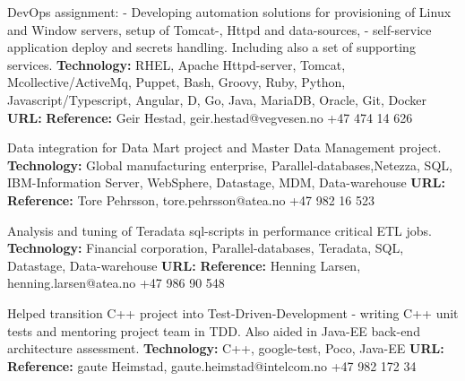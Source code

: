 \documentclass[11pt,a4paper,sans]{moderncv} %
\begin{document}
{
DevOps assignment: - Developing automation solutions for provisioning of Linux and Window servers, setup of Tomcat-, Httpd and data-sources, - self-service application deploy and secrets handling. Including also a set of supporting services.
\newline{}\textbf{Technology:}
RHEL, Apache Httpd-server, Tomcat, Mcollective/ActiveMq, Puppet, Bash, Groovy, Ruby, Python, Javascript/Typescript, Angular, D, Go, Java, MariaDB, Oracle, Git, Docker
\newline{}\textbf{URL:} 
\newline{}\textbf{Reference:} Geir Hestad, geir.hestad@vegvesen.no +47 474 14 626
}

{
Data integration for Data Mart project and Master Data Management project.
\newline{}\textbf{Technology:}
Global manufacturing enterprise, Parallel-databases,Netezza, SQL, IBM-Information Server, WebSphere, Datastage, MDM, Data-warehouse
\newline{}\textbf{URL:} 
\newline{}\textbf{Reference:} Tore Pehrsson, tore.pehrsson@atea.no +47 982 16 523
}

{
Analysis and tuning of Teradata sql-scripts in performance critical ETL jobs.
\newline{}\textbf{Technology:} Financial corporation, Parallel-databases, Teradata, SQL, Datastage, Data-warehouse
\newline{}\textbf{URL:} 
\newline{}\textbf{Reference:} Henning Larsen, henning.larsen@atea.no +47 986 90 548
}

{
Helped transition C++ project into Test-Driven-Development
- writing C++ unit tests and mentoring project team in TDD. Also aided in Java-EE back-end architecture assessment.
\newline{}\textbf{Technology:} C++, google-test, Poco, Java-EE
\newline{}\textbf{URL:} 
\newline{}\textbf{Reference:} gaute Heimstad, gaute.heimstad@intelcom.no  +47 982 172 34
}
\end{document}

